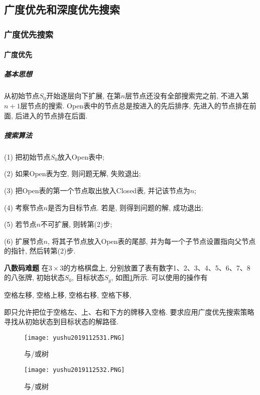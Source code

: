\subsection{广度优先和深度优先搜索}
\subsubsection{广度优先搜索}
\paragraph{广度优先}
\subparagraph{基本思想}
从初始节点$S_0$开始逐层向下扩展, 在第$n$层节点还没有全部搜索完之前, 不进入第$n+1$层节点的搜索. Open表中的节点总是按进入的先后排序, 先进入的节点排在前面, 后进入的节点排在后面.
\subparagraph{搜索算法}

(1) 把初始节点$S_0$放入Open表中;

(2) 如果Open表为空, 则问题无解, 失败退出;

(3) 把Open表的第一个节点取出放入Closed表, 并记该节点为$n$;

(4) 考察节点$n$是否为目标节点. 若是, 则得到问题的解, 成功退出;

(5) 若节点$n$不可扩展, 则转第(2)步;

(6) 扩展节点$n$, 将其子节点放入Open表的尾部, 并为每一个子节点设置指向父节点的指针, 然后转第(2)步.
\begin{example}
\textbf{八数码难题} 在$3\times 3$的方格棋盘上, 分别放置了表有数字1、2、3、4、5、6、7、8的八张牌, 初始状态$S_0$, 目标状态$S_g$, 如图\ref{AI32fig2019120231}所示. 可以使用的操作有
\begin{center}
  空格左移, 空格上移, 空格右移, 空格下移,
\end{center}
即只允许把位于空格左、上、右和下方的牌移入空格. 要求应用广度优先搜索策略寻找从初始状态到目标状态的解路径.
\end{example}
\begin{figure}[H]
\centering
\texttt{[image: yushu2019112531.PNG]}
\caption{与/或树 }
\label{AI32fig2019120231}
\end{figure}
\begin{figure}[H]
\centering
\texttt{[image: yushu2019112532.PNG]}
\caption{与/或树 }
\label{AI32fig32}
\end{figure}
